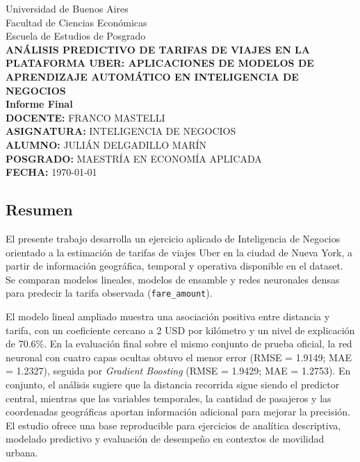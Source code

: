 \documentclass[10pt]{article}
\begin{document}
		\begin{center}
			\Large Universidad de Buenos Aires \\[0.2cm]
			\large Facultad de Ciencias Económicas \\[0.2cm]
			Escuela de Estudios de Posgrado \\[0.4cm]
			\Large \textbf{ANÁLISIS PREDICTIVO DE TARIFAS DE VIAJES EN LA PLATAFORMA UBER: APLICACIONES DE MODELOS DE APRENDIZAJE AUTOMÁTICO EN INTELIGENCIA DE NEGOCIOS} \\[0.4cm]
			\textbf{Informe Final} \\[0.4cm]
			\normalsize \textbf{DOCENTE:} FRANCO MASTELLI  \\[0.6cm]
			\Large \textbf{ASIGNATURA:} INTELIGENCIA DE NEGOCIOS \\[0.5cm]

			\normalsize \textbf{ALUMNO:} JULIÁN DELGADILLO MARÍN \\[0.2cm]
			\textbf{POSGRADO:} MAESTRÍA EN ECONOMÍA APLICADA \\[0.4cm]
			\textbf{FECHA:} \today
			\vspace*{1cm}
		\end{center}

	\begin{center}
		\section*{Resumen}
	\end{center}

	\justify
	El presente trabajo desarrolla un ejercicio aplicado de Inteligencia de Negocios orientado a la estimación de tarifas de viajes Uber en la ciudad de Nueva York, a partir de información geográfica, temporal y operativa disponible en el dataset. Se comparan modelos lineales, modelos de ensamble y redes neuronales densas para predecir la tarifa observada (\texttt{fare\_amount}).

	El modelo lineal ampliado muestra una asociación positiva entre distancia y tarifa, con un coeficiente cercano a 2 USD por kilómetro y un nivel de explicación de 70.6\%. En la evaluación final sobre el mismo conjunto de prueba oficial, la red neuronal con cuatro capas ocultas obtuvo el menor error (RMSE = 1.9149; MAE = 1.2327), seguida por \textit{Gradient Boosting} (RMSE = 1.9429; MAE = 1.2753). En conjunto, el análisis sugiere que la distancia recorrida sigue siendo el predictor central, mientras que las variables temporales, la cantidad de pasajeros y las coordenadas geográficas aportan información adicional para mejorar la precisión. El estudio ofrece una base reproducible para ejercicios de analítica descriptiva, modelado predictivo y evaluación de desempeño en contextos de movilidad urbana.
\end{document}
